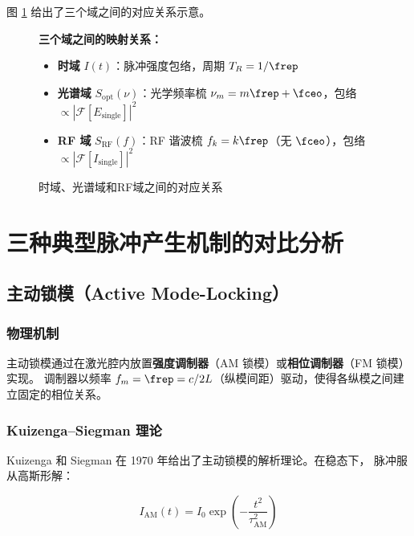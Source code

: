 \documentclass[11pt,a4paper]{article}
\newcommand{\FT}{\mathcal{F}}
\begin{document}
图 \ref{fig:domain_comparison} 给出了三个域之间的对应关系示意。

\begin{figure}[htbp]
\centering
\begin{tcolorbox}[width=0.95\textwidth, colback=blue!5, colframe=blue!50]
\textbf{三个域之间的映射关系：}
\begin{itemize}
    \item \textbf{时域} $I(t)$：脉冲强度包络，周期 $T_R = 1/\frep$
    \item \textbf{光谱域} $S_{\text{opt}}(\nu)$：光学频率梳 $\nu_m = m\frep + \fceo$，包络 $\propto |\FT[E_{\text{single}}]|^2$
    \item \textbf{RF 域} $S_{\text{RF}}(f)$：RF 谐波梳 $f_k = k\frep$（无 $\fceo$），包络 $\propto |\FT[I_{\text{single}}]|^2$
\end{itemize}
\end{tcolorbox}
\caption{时域、光谱域和RF域之间的对应关系}
\label{fig:domain_comparison}
\end{figure}

\section{三种典型脉冲产生机制的对比分析}

\subsection{主动锁模（Active Mode-Locking）}

\subsubsection{物理机制}

主动锁模通过在激光腔内放置\textbf{强度调制器}（AM 锁模）或\textbf{相位调制器}（FM 锁模）实现。
调制器以频率 $f_m = \frep = c/2L$（纵模间距）驱动，使得各纵模之间建立固定的相位关系。

\subsubsection{Kuizenga--Siegman 理论}

Kuizenga 和 Siegman 在 1970 年给出了主动锁模的解析理论\cite{Kuizenga1970}。在稳态下，
脉冲服从高斯形解：

\begin{equation}\label{eq:am_pulse}
I_{\text{AM}}(t) = I_0 \exp\left(-\frac{t^2}{\tau_{\text{AM}}^2}\right)
\end{equation}
\end{document}

